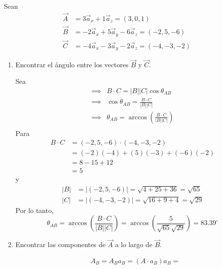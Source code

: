 





\begin{problema}
    Sean 
    \begin{align*}
        \vec{A} &=3 \vec{a}_x+1 \vec{a}_z = (3,0,1)\\
        \vec{B} &=-2 \vec{a}_x+5 \vec{a}_y-6 \vec{a}_z = (-2,5,-6)\\
        \vec{C} &=-4 \vec{a}_x-3 \vec{a}_y-2 \vec{a}_z = (-4,-3,-2)
    \end{align*}
\begin{enumerate}
    \item Encontrar el ángulo entre los vectores $\vec{B}$ y $\vec{C}$.
    \begin{sol}
        Sea
        \begin{align*}
            \implies & B\cdot C = |B||C|\cos \theta_{AB}\\
            \implies & \cos \theta_{AB} =\frac{ B\cdot C}{|B||C|}\\
            \implies & \theta_{AB} =\arccos\left(\frac{ B\cdot C}{|B||C|}\right)\\
        \end{align*}
        Para 
        \begin{align*}
            B\cdot C &= (-2,5,-6)\cdot (-4,-3,-2)\\
                     &= (-2)(-4)+(5)(-3)+(-6)(-2)\\
                     &= 8-15+12\\
                     &= 5
        \end{align*}
        y 
        \begin{align*}
            |B| &= |(-2,5,-6)| = \sqrt{4+25+36}= \sqrt{65}\\
            |C| &= |(-4,-3,-2)| = \sqrt{16+9+4}= \sqrt{29}
        \end{align*}
        Por lo tanto, 
        $$\theta_{AB} =\arccos\left(\frac{ B\cdot C}{|B||C|}\right)= \arccos\left(\frac{ 5}{\sqrt{65}\sqrt{29}}\right)=83.39^\circ $$
    \end{sol}
    \item Encontrar las componentes de $\vec{A}$ a lo largo de $\vec{B}$.
    \begin{sol}
        $$
\begin{aligned}
& A_B =A_B a_B=\left(A \cdot a_B\right) a_B= \\

\end{aligned}$$
\end{sol}
\end{enumerate}
\end{problema}
